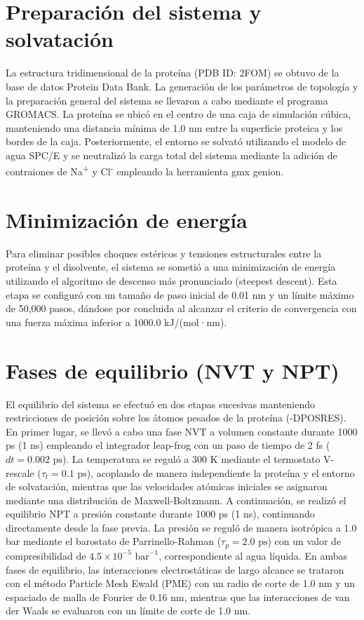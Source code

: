 \section{Preparación del sistema y solvatación}

La estructura tridimensional de la proteína (PDB ID: 2FOM) se obtuvo de la base de datos Protein Data Bank. La generación de los parámetros de topología y la preparación general del sistema se llevaron a cabo mediante el programa GROMACS. La proteína se ubicó en el centro de una caja de simulación cúbica, manteniendo una distancia mínima de 1.0 nm entre la superficie proteica y los bordes de la caja. Posteriormente, el entorno se solvató utilizando el modelo de agua SPC/E y se neutralizó la carga total del sistema mediante la adición de contraiones de Na\textsuperscript{+} y Cl\textsuperscript{-} empleando la herramienta gmx genion.

\section{Minimización de energía}

Para eliminar posibles choques estéricos y tensiones estructurales entre la proteína y el disolvente, el sistema se sometió a una minimización de energía utilizando el algoritmo de descenso más pronunciado (steepest descent). Esta etapa se configuró con un tamaño de paso inicial de 0.01 nm y un límite máximo de 50,000 pasos, dándose por concluida al alcanzar el criterio de convergencia con una fuerza máxima inferior a 1000.0 kJ/(mol·nm).

\section{Fases de equilibrio (NVT y NPT)}

El equilibrio del sistema se efectuó en dos etapas sucesivas manteniendo restricciones de posición sobre los átomos pesados de la proteína (-DPOSRES). En primer lugar, se llevó a cabo una fase NVT a volumen constante durante 1000 ps (1 ns) empleando el integrador leap-frog con un paso de tiempo de 2 fs ($dt = 0.002\text{ ps}$). La temperatura se reguló a 300 K mediante el termostato V-rescale ($\tau_t = 0.1\text{ ps}$), acoplando de manera independiente la proteína y el entorno de solvatación, mientras que las velocidades atómicas iniciales se asignaron mediante una distribución de Maxwell-Boltzmann.
A continuación, se realizó el equilibrio NPT a presión constante durante 1000 ps (1 ns), continuando directamente desde la fase previa. La presión se reguló de manera isotrópica a 1.0 bar mediante el barostato de Parrinello-Rahman ($\tau_p = 2.0\text{ ps}$) con un valor de compresibilidad de $4.5 \times 10^{-5}\text{ bar}^{-1}$, correspondiente al agua líquida. En ambas fases de equilibrio, las interacciones electrostáticas de largo alcance se trataron con el método Particle Mesh Ewald (PME) con un radio de corte de 1.0 nm y un espaciado de malla de Fourier de 0.16 nm, mientras que las interacciones de van der Waals se evaluaron con un límite de corte de 1.0 nm.

